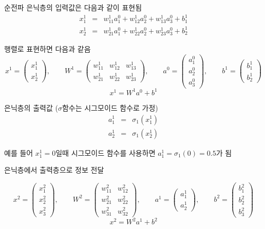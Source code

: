 \documentclass[10pt,t]{beamer}
\begin{document}
\begin{frame}{순전파}
 은닉층의 입력값은 다음과 같이 표현됨
 \begin{eqnarray*}
    x_1^1 &=& w_{11} ^1 a_1^0 + w_{12} ^1 a_2^0 + w_{13} ^1 a_3^0 + b_1^1 \\
    x_2^1 &=& w_{21} ^1 a_1^0 + w_{22} ^1 a_2^0 + w_{23} ^1 a_3^0 + b_2^1   
 \end{eqnarray*}

 행렬로 표현하면 다음과 같음
     \[x^1 = \begin{pmatrix}
         x_1^1\\
         x_2^1
     \end{pmatrix}, \qquad W^1 = \begin{pmatrix}
        w_{11}^1 & w_{12}^1 & w_{13}^1 \\
        w_{21}^1 & w_{22}^1 & w_{23}^1 
     \end{pmatrix}, \qquad a^0 = \begin{pmatrix}
         a_1^0\\
         a_2^0\\
         a_3^0
     \end{pmatrix}, \qquad b^1 = \begin{pmatrix}
        b_1^1\\
        b_2^1
     \end{pmatrix} \]
     \[x^1 = W^1 a^0 + b^1\]
 
\pagebreak
은닉층의 출력값 ($\sigma$함수는 시그모이드 함수로 가정)
\begin{eqnarray*}
    a_1^1 & =& \sigma_1(x_1^1)    \\
    a_2^1 & =& \sigma_1(x_2^1)    
\end{eqnarray*}

 예를 들어 $x_1^1 = 0$일때 시그모이드 함수를 사용하면 $a_1^1 = \sigma_1(0) = 0.5$가 됨


은닉층에서 출력층으로 정보 전달

\[x^2 = \begin{pmatrix}
    x_1^2\\
    x_2^2\\
    x_3^2
\end{pmatrix}, \qquad W^2 = \begin{pmatrix}
   w_{11}^2 & w_{12}^2  \\
   w_{21}^2 & w_{22}^2  \\
   w_{31}^2 & w_{32}^2 
\end{pmatrix}, \qquad a^1 = \begin{pmatrix}
    a_1^1\\
    a_2^1
\end{pmatrix}, \qquad b^2 = \begin{pmatrix}
   b_1^2\\
   b_2^2\\
   b_3^2
\end{pmatrix} \]
\[x^2 = W^2 a^1 + b^2\]


\end{frame}
\end{document}
